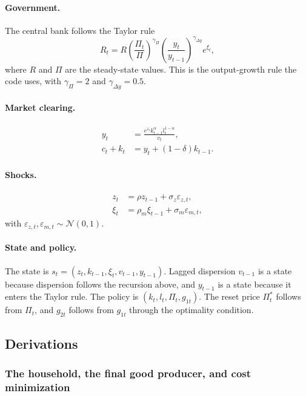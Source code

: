 \documentclass[11pt]{article}
\begin{document}
\paragraph{Government.} The central bank follows the Taylor rule
\begin{equation}
R_t = R \left( \frac{\Pi_t}{\Pi} \right)^{\gamma_\Pi} \left( \frac{y_t}{y_{t-1}} \right)^{\gamma_{\Delta y}} e^{\xi_t},
\end{equation}
where $R$ and $\Pi$ are the steady-state values. This is the output-growth rule the code uses, with $\gamma_\Pi = 2$ and $\gamma_{\Delta y} = 0.5$.

\paragraph{Market clearing.}
\begin{align}
y_t &= \frac{e^{z_t} k_{t-1}^{\alpha} l_t^{1-\alpha}}{v_t}, \\
c_t + k_t &= y_t + (1-\delta) k_{t-1} .
\end{align}

\paragraph{Shocks.}
\begin{align}
z_t &= \rho z_{t-1} + \sigma_z \varepsilon_{z,t}, \\
\xi_t &= \rho_m \xi_{t-1} + \sigma_m \varepsilon_{m,t},
\end{align}
with $\varepsilon_{z,t}, \varepsilon_{m,t} \sim \mathcal{N}(0,1)$.

\paragraph{State and policy.} The state is $s_t = (z_t, k_{t-1}, \xi_t, v_{t-1}, y_{t-1})$. Lagged dispersion $v_{t-1}$ is a state because dispersion follows the recursion above, and $y_{t-1}$ is a state because it enters the Taylor rule. The policy is $(k_t, l_t, \Pi_t, g_{1t})$. The reset price $\Pi_t^{*}$ follows from $\Pi_t$, and $g_{2t}$ follows from $g_{1t}$ through the optimality condition.

\subsection{Derivations}

\subsubsection{The household, the final good producer, and cost minimization}
\end{document}
